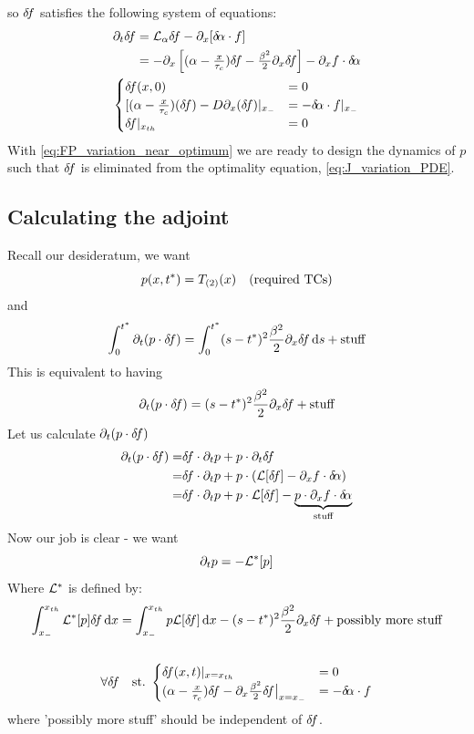 \documentclass{article}
\begin{document}
so ${ \delta\! f}$ satisfies the following system of equations:
\begin{equation}
\begin{gathered}
\begin{aligned}
\di_t \df 
&= \L_\a \df -\di_x [\da \cdot f]
\\
&= -\di_x \left[ (\a - \tfrac x\tc)\df - \tfrac{\b^2}2 \di_x \df \right]
-\di_xf \cdot\da
\end{aligned}
\\
\begin{cases}
\df(x,0) &= 0
\\
[ (\a - \frac x \tc)(\df) - D \di_x (\df) |_\xmin &= -\da \cdot f|_\xmin
\\
\df|_\xth &= 0
\end{cases}
\end{gathered}
\label{eq:FP_variation_near_optimum}
\end{equation} 
With \cref{eq:FP_variation_near_optimum} we are ready to design the dynamics of
$p$ such that ${ \delta\! f}$ is eliminated from the optimality equation,
\cref{eq:J_variation_PDE}.

\subsection{Calculating the adjoint }
Recall our desideratum, we want
$$
p(x,{ t^* }) = { {T}_{(2)} }(x) \quad (\text{required TCs})
$$
and
$$
\int_0^{ t^* } {\partial}_t (p \cdot { \delta\! f}) = \int_0^{ t^* }(s-{ t^* })^2 \frac {{\beta}^2}{2} {\partial}_x 
{ \delta\! f} \, \mathrm{d} s + \text{stuff}
$$
This is equivalent to having
$$
{\partial}_t (p \cdot { \delta\! f}) =  (s-{ t^* })^2 \frac {{\beta}^2}{2} {\partial}_x 
{ \delta\! f}  + \text{stuff}
$$
Let us calculate ${\partial}_t (p \cdot { \delta\! f})$
\begin{align*}
\di_t (p \cdot \df) =& \df \cdot \di_t p + p \cdot   \di_t \df
 \\
 =& \df \cdot \di_t p + p \cdot \left( \L [\df] -\di_xf \cdot\da \right)  
 \\
 =& \df \cdot \di_t p + p \cdot \L  [\df] - \underbrace{ p \cdot \di_xf \cdot\da}_{\text{stuff}}
\end{align*}
Now our job is clear - we want 
$$
{\partial}_t p = -{ { \mathcal{L} }^* }[p]
$$
Where ${ { \mathcal{L} }^* }$ is defined by:
\begin{equation}
\begin{gathered}
\int_\xmin^\xth  \Lstar [p] \df \intd{x} 
=
\int_\xmin^\xth p \L [\df] \intd{x} - (s-\T)^2 \frac {\b^2}{2}\di_x \df +
\text{possibly more stuff}
\\
\\
\forall \df \quad \st \begin{cases}
\df(x,t) |_{x=\xth} & = 0 
\\
(\a - \tfrac x \tc)\df - \di_x \tfrac {\b^2}2 \df \big|_{x=\xmin} &=  -\da
\cdot f
\end{cases}
\end{gathered}
\end{equation}
where 'possibly more stuff' should be independent of ${ \delta\! f}$.
\end{document}
